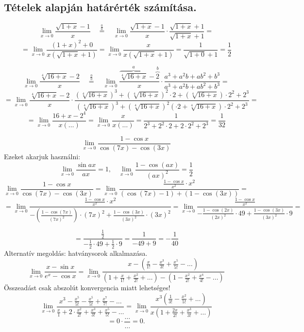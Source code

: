\documentclass[a4paper,11.5pt]{article}
\begin{document}
	\subsection{Tételek alapján határérték számítása.}
	\begin{task}
		\[ \lim_{x\to0}\frac{\sqrt{1+x}-1}{x}\quad \overset{\frac{0}{0}}{=}\quad \lim_{x\to0}\frac{\sqrt{1+x}-1}{x}\cdot\frac{\sqrt{1+x}+1}{\sqrt{1+x}+1}=\]
		\[=\lim_{x\to0}\frac{(1+x)^2+0}{x(\sqrt{1+x}+1)}=\lim_{x\to0}\frac{x}{x(\sqrt{1+x}+1)}=\frac{1}{\sqrt{1+0}+1}=\frac{1}{2} \]
		
	\end{task}
	\begin{task}
		\[ \lim_{x\to0}\frac{\sqrt[4]{16+x}-2}{x}\quad \overset{\frac{0}{0}}{=}\quad \lim_{x\to0}\frac{\overbrace{\sqrt[4]{16+x}}^a-\overbrace{2}^b}{x}\cdot\frac{a^3+a^2b+ab^2+b^3}{a^3+a^2b+ab^2+b^3}=\]
		\[=\lim_{x\to0}\frac{\sqrt[4]{16+x}-2}{x}\cdot\frac{(\sqrt[4]{16+x})^3+(\sqrt[4]{16+x})^2\cdot2+(\sqrt[4]{16+x})\cdot2^2+2^3}{(\sqrt[4]{16+x})^3+(\sqrt[4]{16+x})^2(\cdot2+\sqrt[4]{16+x})\cdot2^2+2^3}=\]
		\[=\lim_{x\to0}\frac{16+x-2^4}{x(\ldots)}=\lim_{x\to0}\frac{x}{x(\ldots)}=\frac{1}{2^3+2^2\cdot2+2\cdot2^2+2^3}=\frac{1}{32} \]
	\end{task}
	\begin{task}
		\[ \lim_{x\to0}\frac{1-\cos x}{\cos(7x)-\cos(3x)} \]
		Ezeket akarjuk használni:
		\[ \lim_{x\to0}\frac{\sin ax}{ax}=1,\quad \lim_{x\to0}\frac{1-\cos(ax)}{(ax)^2}=\frac{1}{2} \]
		\[ \lim_{x\to0}\frac{1-\cos x}{\cos(7x)-\cos(3x)}=\lim_{x\to0}\frac{\frac{1-\cos x}{x^2}\cdot x^2}{(\cos(7x)-1)+(1-\cos(3x))}=\]
		\[=\lim_{x\to0}\frac{\frac{1-\cos x}{x^2}\cdot x^2}{-\left(\frac{1-\cos(7x)}{(7x)^2}\right)\cdot(7x)^2+\frac{1-\cos(3x)}{(3x)^2}\cdot(3x)^2}=\lim_{x\to0}\frac{\frac{1-\cos x}{x^2}}{-\frac{1-\cos(2x)}{(2x)^2}\cdot49+\frac{1-\cos(3x)}{(3x)^2}\cdot9} =\]
			
		\[ =\frac{\frac{1}{2}}{-\frac{1}{2}\cdot49+\frac{1}{2}\cdot9}=\frac{1}{-49+9}=-\frac{1}{40} \]
		Alternatív megoldás: hatványsorok alkalmazása.
		\[ \lim_{x\to0}\frac{x-\sin x}{e^x-\cos x}=\lim_{x\to0}\frac{x-\left(\frac{x}{1!}-\frac{x^3}{3!}+\frac{x^5}{5!}-\ldots\right)}{\left(1+\frac{x}{1!}+\frac{x^2}{2!}+\ldots\right)-\left(1-\frac{x^2}{2!}+\frac{x^4}{4!}-\ldots\right)} \]
		Összeadást csak abszolút konvergencia miatt lehetséges!
		\[ \lim_{x\to0}\frac{x^3-\frac{x^5}{5!}-\frac{x^5}{5!}+\frac{x^7}{7!}-\ldots}{\frac{x}{1}+2\cdot\frac{x^2}{2!}+\frac{x^3}{3!}+\frac{x^5}{5!}-\ldots}=\lim_{x\to0}\frac{x^3(\frac{1}{3!}-\frac{x^2}{5!}+\ldots)}{x\left(1+\frac{2x}{2!}+\frac{x^3}{3!}+\ldots\right)} \]
		\[ =0\cdot\frac{\ldots}{\ldots}=0. \]
	\end{task}
\end{document}
